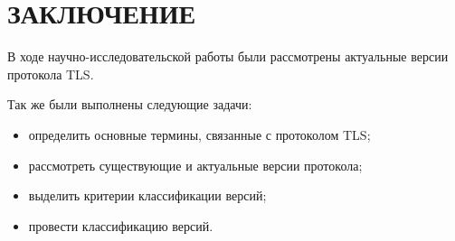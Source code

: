 \chapter*{ЗАКЛЮЧЕНИЕ}

    В ходе научно-исследовательской работы были рассмотрены актуальные версии протокола TLS.
    
    Так же были выполнены следующие задачи:
    
    \begin{itemize}
         \item определить основные термины, связанные с протоколом TLS;
        \item рассмотреть существующие и актуальные версии протокола;
        \item выделить критерии классификации версий;
        \item провести классификацию версий.
    \end{itemize}